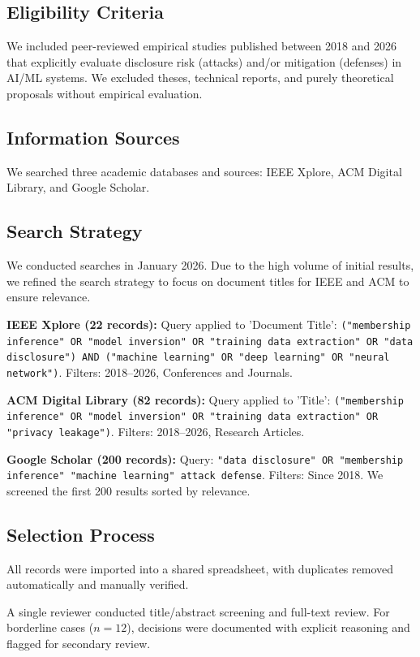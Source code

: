 \documentclass[conference]{IEEEtran}
\begin{document}
\subsection{Eligibility Criteria}
We included peer-reviewed empirical studies published between 2018 and 2026 that explicitly evaluate disclosure risk (attacks) and/or mitigation (defenses) in AI/ML systems. We excluded theses, technical reports, and purely theoretical proposals without empirical evaluation.

\subsection{Information Sources}
We searched three academic databases and sources: IEEE Xplore, ACM Digital Library, and Google Scholar.

\subsection{Search Strategy}
We conducted searches in January 2026. Due to the high volume of initial results, we refined the search strategy to focus on document titles for IEEE and ACM to ensure relevance.

\textbf{IEEE Xplore (22 records):} Query applied to 'Document Title': \texttt{("membership inference" OR "model inversion" OR "training data extraction" OR "data disclosure") AND ("machine learning" OR "deep learning" OR "neural network")}. Filters: 2018--2026, Conferences and Journals.

\textbf{ACM Digital Library (82 records):} Query applied to 'Title': \texttt{("membership inference" OR "model inversion" OR "training data extraction" OR "privacy leakage")}. Filters: 2018--2026, Research Articles.

\textbf{Google Scholar (200 records):} Query: \texttt{"data disclosure" OR "membership inference" "machine learning" attack defense}. Filters: Since 2018. We screened the first 200 results sorted by relevance.

\subsection{Selection Process}
All records were imported into a shared spreadsheet, with duplicates removed automatically and manually verified.

A single reviewer conducted title/abstract screening and full-text review. For borderline cases ($n=12$), decisions were documented with explicit reasoning and flagged for secondary review.
\end{document}
